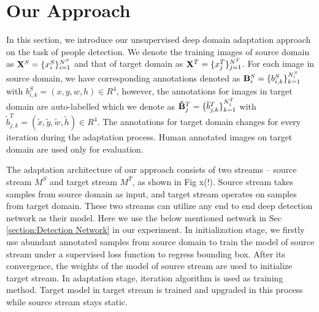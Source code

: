 \documentclass[runningheads]{llncs}
\begin{document}
\section{Our Approach}
\label{section:Our Approach}

In this section, we introduce our unsupervised deep domain adaptation approach on the task of people detection. We denote the training images of source domain as  ${\bf X}^{S} = \{x^{S}_{i}\}^{N^{S}}_{i=1}$ and that of target domain as ${\bf X}^{T} = \{x^{T}_{j}\}^{N^{T}}_{j=1}$. For each image in source domain, we have corresponding annotations denoted as ${\bf B}^{S}_{i} = \{b^{S}_{i,k}\}^{N^{S}_{i}}_{k=1}$ with $b^{S}_{i,k} = (x,y,w,h) \in R^{4}$, however, the annotations for images in target domain are auto-labelled which we denote as ${\bf \tilde{B}}^{T}_{j} = \{\tilde{b}^{T}_{j,k}\}^{N^{T}_{j}}_{k=1}$ with $\tilde{b}^{T}_{j,k} = (\tilde{x},\tilde{y},\tilde{w},\tilde{h}) \in R^{4}$. The annotations for target domain changes for every iteration during the adaptation process. Human annotated images on target domain are used only for evaluation.

The adaptation architecture of our approach consists of two streams -- source stream $M^{S}$ and target stream $M^{T}$, as shown in Fig x(!). Source stream takes samples from source domain as input, and target stream operates on samples from target domain. These two streams can utilize any end to end deep detection network as their model. Here we use the below mentioned network in Sec \ref{section:Detection Network} in our experiment. In initialization stage, we firstly use abundant annotated samples from source domain to train the model of source stream under a supervised loss function to regress bounding box. After its convergence, the weights of the model of source stream are used to initialize target stream. In adaptation stage, iteration algorithm is used as training method. Target model in target stream is trained and upgraded in this process while source stream stays static.
\end{document}
